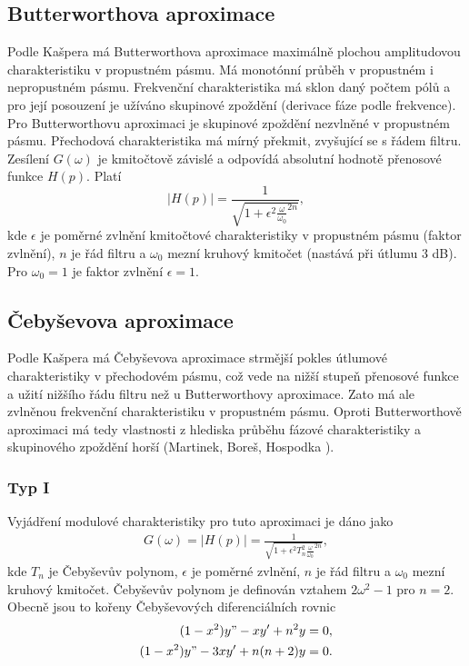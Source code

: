 \subsection{Butterworthova aproximace}
Podle Kašpera \cite{7} má Butterworthova aproximace maximálně plochou amplitudovou charakteristiku v propustném pásmu. Má monotónní průběh v propustném i nepropustném pásmu. Frekvenční charakteristika má sklon daný počtem pólů a pro její posouzení je užíváno skupinové zpoždění (derivace fáze podle frekvence). Pro Butterworthovu aproximaci je skupinové zpoždění nezvlněné v propustném pásmu. Přechodová charakteristika má mírný překmit, zvyšující se s řádem filtru. Zesílení $G(\omega)$ je kmitočtově závislé a odpovídá absolutní hodnotě přenosové funkce $H(p)$. Platí
\begin{equation}
|H(p)| = \frac{1}{\sqrt{1 + \epsilon ^2 \frac{\omega}{\omega _0}^{2n}}},
\end{equation}
kde $\epsilon$ je poměrné zvlnění kmitočtové charakteristiky v propustném pásmu (faktor zvlnění), $n$ je řád filtru a $\omega _0$ mezní kruhový kmitočet (nastává při útlumu 3 dB). Pro $\omega _0 = 1$ je faktor zvlnění $\epsilon = 1$. 
\subsection{Čebyševova aproximace}
Podle Kašpera \cite{7} má Čebyševova aproximace strmější pokles útlumové charakteristiky v přechodovém pásmu, což vede na nižší stupeň přenosové funkce a užití nižšího řádu filtru než u Butterworthovy aproximace. Zato má ale zvlněnou frekvenční charakteristiku v propustném pásmu. Oproti Butterworthově aproximaci má tedy vlastnosti z hlediska průběhu fázové charakteristiky a skupinového zpoždění horší (Martinek, Boreš, Hospodka \cite{10}).
\subsubsection{Typ I}
Vyjádření modulové charakteristiky pro tuto aproximaci je dáno jako
\begin{align}
G(\omega) = |H(p)| = \frac{1}{\sqrt{1 + \epsilon ^2 T_n ^2 \frac{\omega}{\omega _0}^{2n}}},
\end{align}
kde $T_n$ je Čebyševův polynom, $\epsilon$ je poměrné zvlnění, $n$ je řád filtru a $\omega _0$ mezní kruhový kmitočet. Čebyševův polynom je definován vztahem $2 \omega ^2 - 1$ pro $n = 2$. Obecně jsou to kořeny Čebyševových diferenciálních rovnic
\begin{align}
(1 - x^2)y" - xy' + n^2y &= 0,\\
(1 - x^2)y" - 3xy' + n(n+2)y &= 0.
\end{align}
